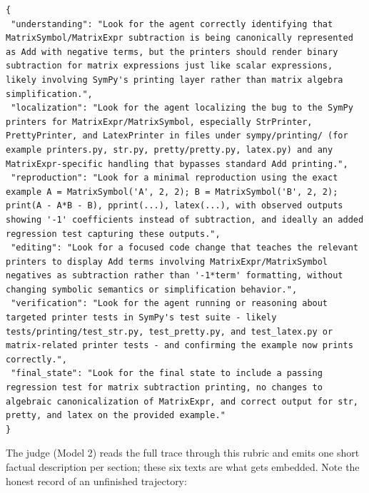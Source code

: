 \documentclass[10pt,twocolumn]{article}
\begin{document}
\begin{lstlisting}
{
 "understanding": "Look for the agent correctly identifying that MatrixSymbol/MatrixExpr subtraction is being canonically represented as Add with negative terms, but the printers should render binary subtraction for matrix expressions just like scalar expressions, likely involving SymPy's printing layer rather than matrix algebra simplification.",
 "localization": "Look for the agent localizing the bug to the SymPy printers for MatrixExpr/MatrixSymbol, especially StrPrinter, PrettyPrinter, and LatexPrinter in files under sympy/printing/ (for example printers.py, str.py, pretty/pretty.py, latex.py) and any MatrixExpr-specific handling that bypasses standard Add printing.",
 "reproduction": "Look for a minimal reproduction using the exact example A = MatrixSymbol('A', 2, 2); B = MatrixSymbol('B', 2, 2); print(A - A*B - B), pprint(...), latex(...), with observed outputs showing '-1' coefficients instead of subtraction, and ideally an added regression test capturing these outputs.",
 "editing": "Look for a focused code change that teaches the relevant printers to display Add terms involving MatrixExpr/MatrixSymbol negatives as subtraction rather than '-1*term' formatting, without changing symbolic semantics or simplification behavior.",
 "verification": "Look for the agent running or reasoning about targeted printer tests in SymPy's test suite - likely tests/printing/test_str.py, test_pretty.py, and test_latex.py or matrix-related printer tests - and confirming the example now prints correctly.",
 "final_state": "Look for the final state to include a passing regression test for matrix subtraction printing, no changes to algebraic canonicalization of MatrixExpr, and correct output for str, pretty, and latex on the provided example."
}
\end{lstlisting}

\noindent The judge (Model 2) reads the full trace through this rubric and
emits one short factual description per section; these six texts are what
gets embedded. Note the honest record of an unfinished trajectory:
\end{document}
